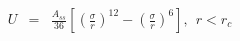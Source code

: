 


\begin{eqnarray}
	U &=& \frac{A_{ss}}{36} \left[ \left( \frac{\sigma}{r}
	\right)^{12} - \left( \frac{ \sigma}{r} \right)^6 \right], ~~
	r < r_c \nonumber
\end{eqnarray}



